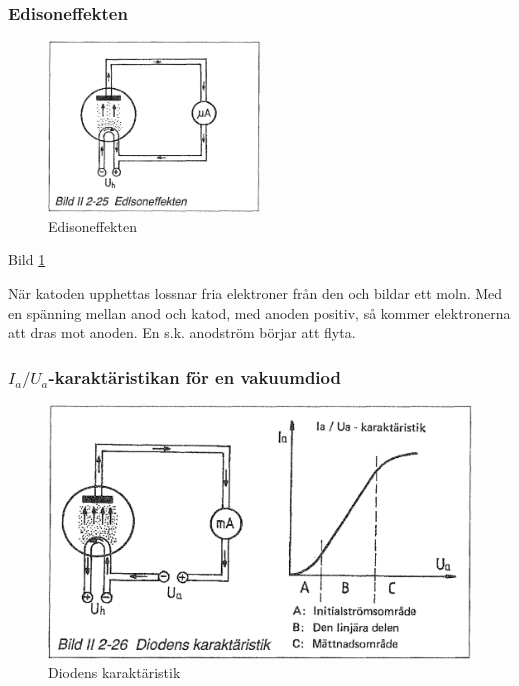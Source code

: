 \subsubsection{Edisoneffekten}

\begin{figure}
\includegraphics[width=0.5\textwidth]{images/bild_2_2-25}
\caption{Edisoneffekten}
\label{fig:BildII2-25}
\end{figure}

Bild \ref{fig:BildII2-25}

När katoden upphettas lossnar fria elektroner från den och bildar ett moln. Med
en spänning mellan anod och katod, med anoden positiv, så kommer elektronerna
att dras mot anoden. En s.k. anodström börjar att flyta.

\subsubsection{\(I_a/U_a\)-karaktäristikan för en vakuumdiod}

\begin{figure}
\includegraphics[width=\textwidth]{images/bild_2_2-26}
\caption{Diodens karaktäristik}
\label{fig:BildII2-26}
\end{figure}

